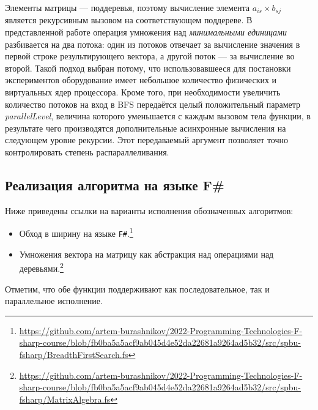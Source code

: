 Элементы матрицы --- поддеревья, поэтому вычисление элемента $a_{is} \times b_{sj}$ является рекурсивным вызовом на соответствующем поддереве. В представленной работе операция умножения над \textit{минимальными единицами} разбивается на два потока: один из потоков отвечает за вычисление значения в первой строке результирующего вектора, а другой поток --- за вычисление во второй. Такой подход выбран потому, что использовавшееся для постановки экспериментов оборудование имеет небольшое количество физических и виртуальных ядер процессора. Кроме того, при необходимости увеличить количество потоков на вход в BFS передаётся целый положительный параметр \textit{parallelLevel}, величина которого уменьшается с каждым вызовом тела функции, в результате чего производятся дополнительные асинхронные вычисления на следующем уровне рекурсии. Этот передаваемый аргумент позволяет точно контролировать степень распараллеливания.

\subsection{Реализация алгоритма на языке F\#}
Ниже приведены ссылки на варианты исполнения обозначенных алгоритмов:
\begin{itemize}
	\item Обход в ширину на языке \texttt{F\#}.\footnote{\url{https://github.com/artem-burashnikov/2022-Programming-Technologies-F-sharp-course/blob/fb0ba5a5acf9ab045d4e52da22681a9264ad5b32/src/spbu-fsharp/BreadthFirstSearch.fs}}
	\item Умножения вектора на матрицу как абстракция над операциями над деревьями.\footnote{\url{https://github.com/artem-burashnikov/2022-Programming-Technologies-F-sharp-course/blob/fb0ba5a5acf9ab045d4e52da22681a9264ad5b32/src/spbu-fsharp/MatrixAlgebra.fs}}
\end{itemize}

Отметим, что обе функции поддерживают как последовательное, так и параллельное исполнение.